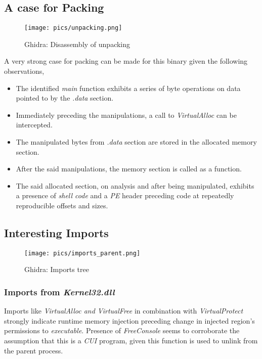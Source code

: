 \documentclass[10pt,a4paper]{article}
\begin{document}
\subsection{A case for Packing}
\begin{figure}[!htbp]%
	\centering
	\texttt{[image: pics/unpacking.png]}
	\caption{Ghidra: Disassembly of unpacking}
	\label{unpacking}
\end{figure}
A very strong case for packing can be made for this binary given the following observations,
\begin{itemize}
	\item The identified \textit{main} function exhibits a series of byte operations on data pointed to by the \textit{.data} section.
	\item Immediately preceding the manipulations, a call to \textit{VirtualAlloc} can be intercepted.
	\item The manipulated bytes from \textit{.data} section are stored in the allocated memory section.
	\item After the said manipulations, the memory section is called as a function.
	\item The said allocated section, on analysis and after being manipulated, exhibits a presence of \textit{shell code} and a \textit{PE} header preceding code at repeatedly reproducible offsets and sizes.
\end{itemize}

\subsection{Interesting Imports}
\begin{figure}[!htbp]%
	\centering
	\texttt{[image: pics/imports\_parent.png]}
	\caption{Ghidra: Imports tree}
	\label{imports_parent}
\end{figure}
	\subsubsection{Imports from \textit{Kernel32.dll}}
	Imports like \textit{VirtualAlloc and VirtualFree} in combination with \textit{VirtualProtect} strongly indicate runtime memory injection preceding change in injected region's permissions to \textit{executable}.
	Presence of \textit{FreeConsole} seems to corroborate the assumption that this is a \textit{CUI} program, given this function is used to unlink from the parent process.
\end{document}
